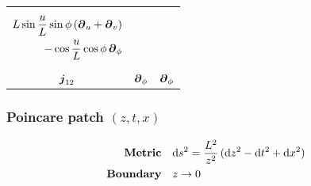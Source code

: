 \documentclass[a4paper,12pt]{article}
\begin{document}
\begin{table}[H]
\begin{adjustbox}{width=0.80\textwidth}
\begin{tabular}{ccc}
{\begin{equation*}
\begin{split}
                           L \sin\frac{u}{L} \sin\phi \, (\boldsymbol{\partial}_u + \boldsymbol{\partial}_v) \\ - \cos\frac{u}{L} \cos\phi \, \boldsymbol{\partial}_\phi 
                        \end{split}
                     \end{equation*}} \\
                     $\boldsymbol{j}_{1 2}$ & $\boldsymbol{\partial}_\phi$ & $\boldsymbol{\partial}_\phi$ \\
                  \bottomrule
               \end{tabular}
            \end{adjustbox}
         \end{table}


         \subsubsection{Poincare patch \texorpdfstring{$(z, t, x)$}{}}
         \begin{align}
            \text{\textbf{Metric}} &\quad \text{d} s^2 = \frac{L^2}{z^2} \, (\text{d} z^2 - \text{d} t^2 + \text{d} x^2) \\
         \text{\textbf{Boundary}} &\quad z \to 0
         \end{align}
\end{document}
